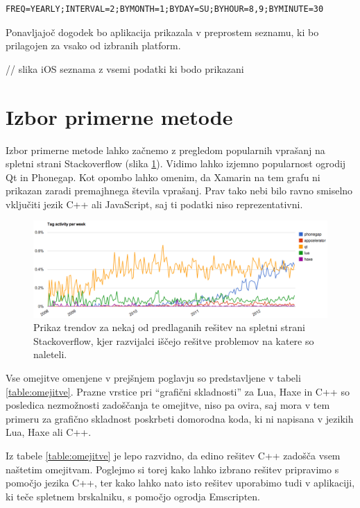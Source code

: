 \begin{lstlisting}[caption=Primer uporabe pravila RRULE standarda RFC 5545., label=code:rrule]
FREQ=YEARLY;INTERVAL=2;BYMONTH=1;BYDAY=SU;BYHOUR=8,9;BYMINUTE=30
\end{lstlisting}

Ponavljajoč dogodek bo aplikacija prikazala v preprostem seznamu, ki bo prilagojen za vsako od izbranih platform.

// slika iOS seznama z vsemi podatki ki bodo prikazani

\section{Izbor primerne metode}

Izbor primerne metode lahko začnemo z pregledom popularnih vprašanj na spletni strani Stackoverflow (slika \ref{fig:stackoverflow-trends}). Vidimo lahko izjemno popularnost ogrodij Qt in Phonegap. Kot opombo lahko omenim, da Xamarin na tem grafu ni prikazan zaradi premajhnega števila vprašanj. Prav tako nebi bilo ravno smiselno vključiti jezik C++ ali JavaScript, saj ti podatki niso reprezentativni.

\begin{figure}
 \includegraphics[width=\linewidth]{stackoverflow-trends}
 \caption{Prikaz trendov za nekaj od predlaganih rešitev na spletni strani Stackoverflow, kjer razvijalci iščejo rešitve problemov na katere so naleteli.}
 \label{fig:stackoverflow-trends}
\end{figure}

Vse omejitve omenjene v prejšnjem poglavju so predstavljene v tabeli \ref{table:omejitve}. Prazne vrstice pri ``grafični skladnosti'' za Lua, Haxe in C++ so posledica nezmožnosti zadoščanja te omejitve, niso pa ovira, saj mora v tem primeru za grafično skladnost poskrbeti domorodna koda, ki ni napisana v jezikih Lua, Haxe ali C++.

Iz tabele \ref{table:omejitve} je lepo razvidno, da edino rešitev C++ zadošča vsem naštetim omejitvam. Poglejmo si torej kako lahko izbrano rešitev pripravimo s pomočjo jezika C++, ter kako lahko nato isto rešitev uporabimo tudi v aplikaciji, ki teče spletnem brskalniku, s pomočjo ogrodja Emscripten.

